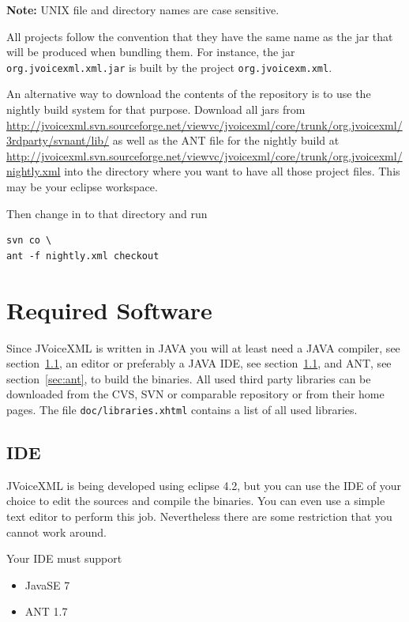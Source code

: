 \documentclass[11pt,a4paper]{article}
\begin{document}
\textbf{Note:} UNIX file and directory names are case sensitive.

All projects follow the convention that they have the same name as the jar
that will be produced when bundling them. For instance, the jar \lstinline{org.jvoicexml.xml.jar}
is built by the project \lstinline{org.jvoicexm.xml}.

An alternative way to download the contents of the repository is to use the 
nightly build system for that purpose. Download all jars from
\url{http://jvoicexml.svn.sourceforge.net/viewvc/jvoicexml/core/trunk/org.jvoicexml/3rdparty/svnant/lib/}
as well as the ANT file for the nightly build at
\url{http://jvoicexml.svn.sourceforge.net/viewvc/jvoicexml/core/trunk/org.jvoicexml/nightly.xml}
into the directory where you want to have all those project files. This may be
your eclipse workspace.

Then change in to that directory and run
\begin{lstlisting}
svn co \
ant -f nightly.xml checkout
\end{lstlisting}


\section{Required Software}
\label{sec:required-software}

Since JVoiceXML is written in JAVA you will at least need a
JAVA compiler, see section~\ref{sec:ide}, an editor or preferably a JAVA
IDE, see section~\ref{sec:ide}, and ANT, see section~\ref{sec:ant}, to build the
binaries. All used third party libraries can be downloaded from the CVS, SVN or
comparable repository or from their home pages. The file
\texttt{doc/libraries.xhtml} contains a list of all used libraries.


\subsection{IDE}
\label{sec:ide}

JVoiceXML is being developed using eclipse 4.2, but you can use the IDE of your
choice to edit the sources and compile the binaries. You can even use a simple
text editor to perform this job. Nevertheless there are some restriction that
you cannot work around.

Your IDE must support

\begin{itemize}
\item JavaSE 7
\item ANT 1.7
\end{itemize}
\end{document}
